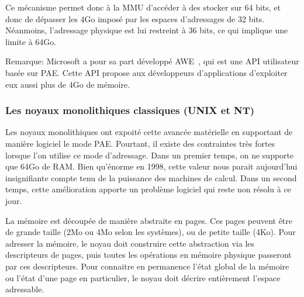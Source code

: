       Ce mécanisme permet donc à la MMU d'accéder à des stocker sur 64 bits, et
      donc de dépasser les 4Go imposé par les espaces d'adressages de 32
      bits. Néanmoins, l'adressage physique est lui restreint à 36 bits, ce qui
      implique une limite à 64Go.

      \begin{paragraph}{Remarque:}
        Microsoft a pour sa part développé AWE~\citep{russinovich2012windows},
        qui est une API utilisateur basée sur PAE. Cette API propose aux
        développeurs d'applications d'exploiter eux aussi plus de 4Go de
        mémoire.\newline
      \end{paragraph}


    \subsubsection{}





    \subsubsection{Les noyaux monolithiques classiques (UNIX et NT)}

      Les noyaux monolithiques ont expoité cette avancée matérielle en
      supportant de manière logiciel le mode PAE. Pourtant, il existe des
      contraintes très fortes lorsque l'on utilise ce mode d'adressage. Dans un
      premier temps, on ne supporte que 64Go de RAM. Bien qu'énorme en 1998,
      cette valeur nous parait aujourd'hui insignifiante compte tenu de la
      puissance des machines de calcul.  Dans un second temps, cette
      amélioration apporte un problème logiciel qui reste non résolu à ce
      jour.\newline

      La mémoire est découpée de manière abstraite en pages. Ces pages peuvent
      être de grande taille (2Mo ou 4Mo selon les systèmes), ou de petite taille
      (4Ko). Pour adresser la mémoire, le noyau doit construire cette
      abstraction via les descripteurs de pages, puis toutes les opérations en
      mémoire physique passeront par ces descripteurs. Pour connaitre en
      permanence l'état global de la mémoire ou l'état d'une page en
      particulier, le noyau doit décrire entièrement l'espace
      adressable.

